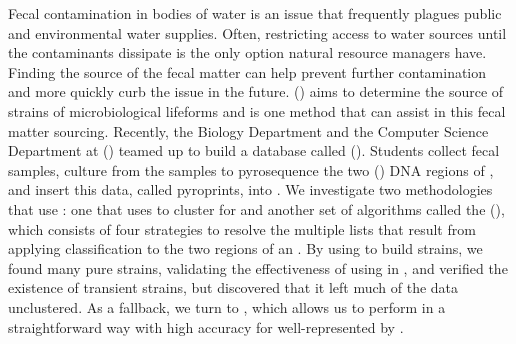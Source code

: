 Fecal contamination in bodies of water is an issue that frequently plagues public and environmental water supplies.
Often, restricting access to water sources until the contaminants dissipate is the only option natural resource managers have.
Finding the source of the fecal matter can help prevent further contamination and more quickly curb the issue in the future.
\MSTlong{} (\mst{}) aims to determine the source \spec{} of strains of microbiological lifeforms and \libdep{} \mst{} is one method that can assist in this fecal matter sourcing.
Recently, the Biology Department and the Computer Science Department at \cplong{} (\cp{}) teamed up to build a database called \cploplong{} (\cplop{}).
Students collect fecal samples, culture \ecoli{} \isols{} from the samples to pyrosequence the two \itslong{} (\itsshort{}) DNA regions of \ecoli{}, and insert this data, called pyroprints, into \cplop{}.
We investigate two \mst{} methodologies that use \cplop{}: one that uses \dbscan{} to cluster for \bslongs{} and another set of algorithms called the \kraplong{} (\krap{}), which consists of four strategies to resolve the multiple \knnlong{} lists that result from applying \kNNlong{} classification to the two \itsshort{} regions of an \ecoli{} \isol{}.
By using \dbscan{} to build strains, we found many pure strains, validating the effectiveness of using \ecoli{} in \cplop{}, and verified the existence of transient strains, but discovered that it left much of the data unclustered.
As a fallback, we turn to \krap{}, which allows us to perform \mst{} in a straightforward way with high accuracy for \spec{} well-represented by \cplop{}.
\vspace{-72pt}